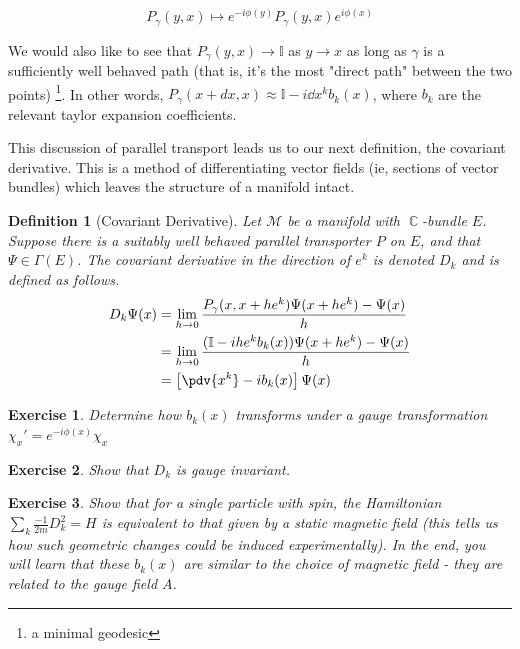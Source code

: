 \documentclass{article}
\newtheorem{exercise}{Exercise}[section]
\DeclareMathOperator{\CC}{\mathbb{C}}
\newtheorem{defn}{Definition}
\begin{document}
\begin{equation}
P_\gamma(y,x) \mapsto e^{-i\phi(y)}P_\gamma(y,x) e^{i\phi(x)}
\end{equation}

We would also like to see that $P_\gamma(y,x) \to \mathbb{I}$ as $y \to x$ as long as $\gamma$ is a sufficiently well behaved path (that is, it's the most "direct path" between the two points) \footnote{a minimal geodesic}. In other words, $P_\gamma(x+dx,x) \approx \mathbb{I} - i \dd x^k b_k(x)$, where $b_k$ are the relevant taylor expansion coefficients. 

This discussion of parallel transport leads us to our next definition, the covariant derivative. This is a method of differentiating vector fields (ie, sections of vector bundles) which leaves the structure of a manifold intact.

\begin{defn}[Covariant Derivative]
Let $\mathcal{M}$ be a manifold with $\CC$-bundle $E$. Suppose there is a suitably well behaved parallel transporter $P$ on $E$, and that $\Psi \in \Gamma(E)$. The covariant derivative in the direction of $e^k$ is denoted $D_k$ and is defined as follows.
\begin{align}
D_k \Psi(x) &= \lim_{h \to 0} \frac{P_\gamma (x,x+h e^k) \Psi(x+he^k) - \Psi(x)}{h}\\
	&= \lim_{h \to 0}\frac{(\mathbb{I} - i h e^k b_k(x))\Psi(x+ he^k) - \Psi(x)}{h}\\
	&= \left[\pdv{x^k}-ib_k(x)\right]\Psi(x)
\end{align} 
\end{defn}

\begin{exercise}
	Determine how $b_k(x)$ transforms under a gauge transformation $ \chi_x' = e^{-i\phi(x)}\chi_x $ 
\end{exercise}
\begin{exercise}
	Show that $D_k$ is gauge invariant.
\end{exercise}

\begin{exercise}
	Show that for a single particle with spin, the Hamiltonian $\sum_k \frac{-1}{2m} D_k^2 = H$ is equivalent to that given by a static magnetic field (this tells us how such geometric changes could be induced experimentally). In the end, you will learn that these $b_k(x)$ are similar to the choice of magnetic field - they are related to the gauge field $A$.
\end{exercise}
\end{document}
